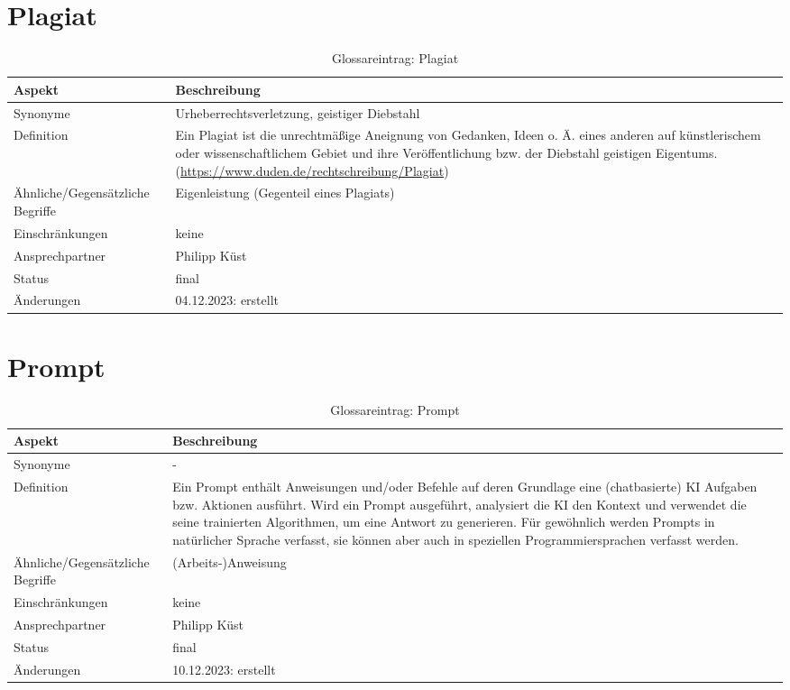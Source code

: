 \section{Plagiat}\label{sec:glossar_plagiat}
\begin{table}[H]\label{tab:glossar_plagiat}
    \begin{tabularx}{\textwidth}{|l|X|}
        \hline
        \textbf{Aspekt} & \textbf{Beschreibung} \\
        \hline
        Synonyme & Urheberrechtsverletzung, geistiger Diebstahl \\
        \hline
        Definition & Ein Plagiat ist die unrechtmäßige Aneignung von Gedanken, Ideen o. Ä. eines anderen auf künstlerischem  oder wissenschaftlichem Gebiet und ihre Veröffentlichung bzw. der Diebstahl geistigen Eigentums.
        (\url{https://www.duden.de/rechtschreibung/Plagiat}) \\
        \hline
        Ähnliche/Gegensätzliche Begriffe & Eigenleistung (Gegenteil eines Plagiats) \\
        \hline
        Einschränkungen & keine \\
        \hline
        Ansprechpartner & Philipp Küst \\
        \hline
        Status & final \\
        \hline
        Änderungen & 04.12.2023: erstellt \\
        \hline
    \end{tabularx}
    \caption{Glossareintrag: Plagiat}
\end{table}

\section{Prompt}\label{sec:glossar_prompt}
\begin{table}[H]\label{tab:glossar_prompt}
    \begin{tabularx}{\textwidth}{|l|X|}
        \hline
        \textbf{Aspekt} & \textbf{Beschreibung} \\
        \hline
        Synonyme & - \\
        \hline
        Definition & Ein Prompt enthält Anweisungen und/oder Befehle auf deren Grundlage eine (chatbasierte) KI Aufgaben bzw. Aktionen ausführt.
        Wird ein Prompt ausgeführt, analysiert die KI den Kontext und verwendet die seine trainierten Algorithmen, um eine Antwort zu generieren.
        Für gewöhnlich werden Prompts in natürlicher Sprache verfasst, sie können aber auch in speziellen Programmiersprachen verfasst werden.\\
        \hline
        Ähnliche/Gegensätzliche Begriffe & (Arbeits-)Anweisung \\
        \hline
        Einschränkungen & keine\\
        \hline
        Ansprechpartner & Philipp Küst \\
        \hline
        Status & final \\
        \hline
        Änderungen & 10.12.2023: erstellt \\
        \hline
    \end{tabularx}
    \caption{Glossareintrag: Prompt}
\end{table}

